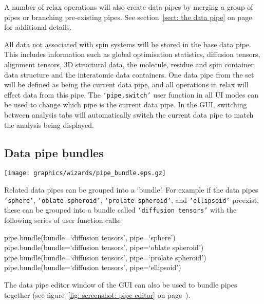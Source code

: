 
A number of relax operations will also create data pipes by merging a group of pipes or branching pre-existing pipes.  See section~\ref{sect: the data pipe} on page~\pageref{sect: the data pipe} for additional details.

All data not associated with spin systems will be stored in the base data pipe.  This includes information such as global optimisation statistics, diffusion tensors, alignment tensors, 3D structural data, the molecule, residue and spin container data structure and the interatomic data containers.  One data pipe from the set will be defined as being the current data pipe, and all operations in relax will effect data from this pipe.  The \texttt{`pipe.switch'} user function in all UI modes can be used to change which pipe is the current data pipe.  In the GUI, switching between analysis tabs will automatically switch the current data pipe to match the analysis being displayed.




\subsection{Data pipe bundles}

\begin{figure*}[h]
\texttt{[image: graphics/wizards/pipe\_bundle.eps.gz]}
\end{figure*}

Related data pipes can be grouped into a `bundle'.  For example if the data pipes \texttt{`sphere'}, \texttt{`oblate spheroid'}, \texttt{`prolate spheroid'}, and \texttt{`ellipsoid'} preexist, these can be grouped into a bundle called \texttt{`diffusion tensors'} with the following series of user function calls:

\begin{exampleenv}
pipe.bundle(bundle=`diffusion tensors', pipe=`sphere') \\
pipe.bundle(bundle=`diffusion tensors', pipe=`oblate spheroid') \\
pipe.bundle(bundle=`diffusion tensors', pipe=`prolate spheroid') \\
pipe.bundle(bundle=`diffusion tensors', pipe=`ellipsoid')
\end{exampleenv}

The data pipe editor window of the GUI can also be used to bundle pipes together (see figure~\ref{fig: screenshot: pipe editor} on page~\pageref{fig: screenshot: pipe editor}).



